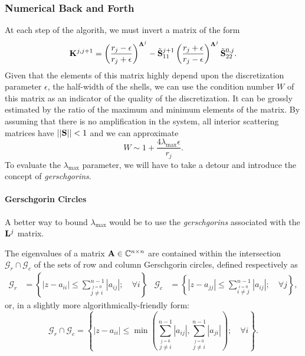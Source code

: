 \subsubsection{Numerical Back and Forth}
At each step of the algorith, we must invert
a matrix of the form 
  \begin{equation}
  \mathbf{K}^{j,j+1} = \left(\frac{r_j-\epsilon}{r_j+\epsilon}\right)^{\boldsymbol{\Lambda}^j}
		    -\tilde{\mathbf{S}}^{j+1}_{11}\left(\frac{r_j+\epsilon}{r_j-\epsilon}\right)^{\boldsymbol{\Lambda}^j}\tilde{\mathbf{S}}^{0,j}_{22}.
  \end{equation}
Given that the elements of this matrix highly depend upon the discretization
parameter $\epsilon$, the half-width of the shells, we can use the
condition number $W$ of this matrix as an indicator of the quality
of the discretization. It can be grossly estimated by the 
ratio of the maximum and minimum elements of the matrix. 
By assuming that there is no amplification in the system,
all interior scattering matrices have
$||\mathbf{S}||<1$ and we can approximate
  \begin{equation}
   W \sim 1 + \frac{4\lambda_\text{max}\epsilon}{r_j}.
  \end{equation}
To evaluate the $\lambda_\text{max}$ parameter, we will
have to take a detour and introduce the concept 
of \textit{\glspl{gerschgorin}}.
\paragraph{Gerschgorin Circles}
A better way to bound $\lambda_\text{max}$ would be to 
use the \textit{\glspl{gerschgorin}} associated with the $\mathbf{L}^j$
matrix.

\begin{thm}
 The eigenvalues of a matrix $\mathbf{A}\in\mathbb{C}^{n\times n}$ are
 contained within the intersection $\mathcal{G}_r\cap\mathcal{G}_c$
 of the sets of row and column Gerschgorin circles, defined respectively as
  \begin{align*}
   \mathcal{G}_r	&= \left\{|z-a_{ii}| \leq \sum_{\stackrel{j=0}{j\neq i}}^{n-1} |a_{ij}|; \quad \forall i\right\}
  & \mathcal{G}_c	&= \left\{|z-a_{jj}| \leq \sum_{\stackrel{i=0}{i\neq j}}^{n-1} |a_{ij}|; \quad \forall j\right\},
  \end{align*}
 or, in a slightly more algorithmically-friendly form:
  \begin{equation}
   \mathcal{G}_r\cap\mathcal{G}_c = \left\{|z-a_{ii}| \leq \min\left(\sum_{\stackrel{j=0}{j\neq i}}^{n-1} |a_{ij}|,\sum_{\stackrel{j=0}{j\neq i}}^{n-1} |a_{ji}|\right)
				     ;\quad \forall i\right\}.
  \end{equation}
\end{thm}

